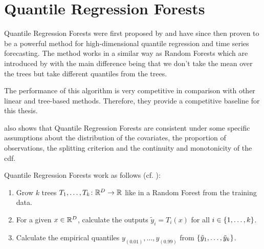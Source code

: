 \section{Quantile Regression Forests}
\label{sec:qrf}

Quantile Regression Forests were first proposed by \Textcite{Meinshausen2006}
and have since then proven to be a powerful method for high-dimensional quantile 
regression and time series forecasting. 
The method works in a similar way as Random Forests which are introduced by \Textcite{Breiman2001}
with the main difference 
being that we don't take the mean over the trees but take different quantiles 
from the trees.

The performance of this algorithm is very competitive in comparison with other 
linear and tree-based methods.
Therefore, they provide a competitive baseline for this thesis. 

\Textcite{Meinshausen2006} also shows that Quantile Regression Forests are consistent 
under some specific assumptions about the distribution of the covariates, the proportion of observations, the splitting criterion and the 
continuity and monotonicity of the \gls{cdf}.

Quantile Regression Forests work as follows (cf. \Textcite{Meinshausen2006}):
\begin{enumerate}
    \item Grow \(k\) trees \(T_1, \ldots, T_k\colon \mathbb{R}^D \rightarrow \mathbb{R}\) like in a Random Forest from the training data.
    \item For a given \(x\in\mathbb{R}^D\), calculate the outputs \( \tilde{y}_i = T_i(x) \) for all \(i \in \{1, \ldots, k\}\).
    \item Calculate the empirical quantiles \(y_{(0.01)}, \ldots, y_{(0.99)}\) from 
    \(\{\tilde{y}_1, \ldots, \tilde{y}_k\}\).
\end{enumerate}